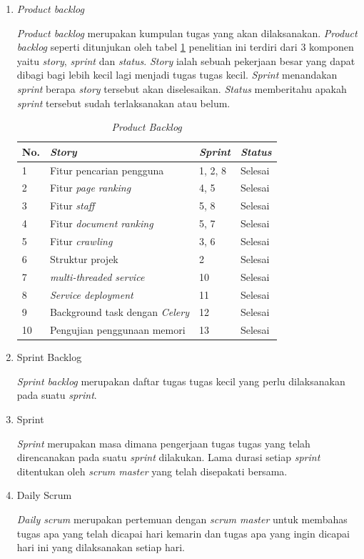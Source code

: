 \begin{enumerate}
	\item \textit{Product backlog}

	\textit{Product backlog} merupakan kumpulan tugas yang akan dilaksanakan. \textit{Product backlog} seperti ditunjukan oleh tabel \ref{productbacklog} penelitian ini terdiri dari 3 komponen yaitu \textit{story}, \textit{sprint} dan \textit{status}. \textit{Story} ialah sebuah pekerjaan besar yang dapat dibagi bagi lebih kecil lagi menjadi tugas tugas kecil. \textit{Sprint} menandakan \textit{sprint} berapa \textit{story} tersebut akan diselesaikan. \textit{Status} memberitahu apakah \textit{sprint} tersebut sudah terlaksanakan atau belum.
	
	\begin{table}[H]
		\centering
		\caption{\textit{Product Backlog}}
		\label{productbacklog}
		\begin{tabular}{@{} |p{1cm}|p{7cm}| p{1cm} |p{2.5cm}|@{}}
			\hline
			\textbf{No.} & \textbf{\textit{Story}} & \textbf{\textit{Sprint}} & \textbf{\textit{Status}} \\
			\hline
			1 & Fitur pencarian pengguna & 1, 2, 8 & Selesai \\
			\hline
			2 & Fitur \textit{page ranking} & 4, 5 & Selesai\\
			\hline
			3 & Fitur \textit{staff} & 5, 8 & Selesai\\
			\hline
			4 & Fitur \textit{document ranking} & 5, 7  & Selesai\\
			\hline
			5 & Fitur \textit{crawling} & 3, 6 & Selesai\\
			\hline
			6 & Struktur projek & 2 & Selesai\\
			\hline
			7 & \textit{multi-threaded service} & 10  & Selesai\\
			\hline
			8 & \textit{Service deployment} & 11  & Selesai\\
			\hline
			9 & Background task dengan \textit{Celery} & 12  & Selesai\\
			\hline
			10 & Pengujian penggunaan memori & 13  & Selesai\\
			\hline
		\end{tabular}
	\end{table}

	\item{Sprint Backlog}
	
	\textit{Sprint backlog} merupakan daftar tugas tugas kecil yang perlu dilaksanakan pada suatu \textit{sprint}.
	
	\item{Sprint}
	
	\textit{Sprint} merupakan masa dimana pengerjaan tugas tugas yang telah direncanakan pada suatu \textit{sprint} dilakukan. Lama durasi setiap \textit{sprint} ditentukan oleh \textit{scrum master} yang telah disepakati bersama.
	
	\item{Daily Scrum}
	
	\textit{Daily scrum} merupakan pertemuan dengan \textit{scrum master} untuk membahas tugas apa yang telah dicapai hari kemarin dan tugas apa yang ingin dicapai hari ini yang dilaksanakan setiap hari.
\end{enumerate}

